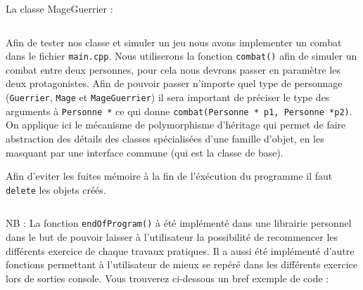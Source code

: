 La classe MageGuerrier :
\inputminted[linenos,firstline=7,lastline=21]{cpp}{../sources/cpp/TP9-10/MageGuerrier.cpp}

Afin de tester nos classe et simuler un jeu nous avons implementer un combat dans le fichier \texttt{main.cpp}.
Nous utiliserons la fonction \texttt{combat()} afin de simuler un combat entre deux personnes, pour cela nous devrons passer en paramètre les deux protagonistes.
Afin de pouvoir passer n'importe quel type de personnage (\texttt{Guerrier}, \texttt{Mage} et \texttt{MageGuerrier}) il sera important de préciser le type des arguments à \texttt{Personne *} ce qui donne \texttt{combat(Personne * p1, Personne *p2)}.
On applique ici le mécanisme de polymorphisme d'héritage qui permet de faire abstraction des détails des classes spécialisées d'une famille d'objet, en les masquant par une interface commune (qui est la classe de base).

Afin d'eviter les fuites mémoire à la fin de l'éxécution du programme il faut \texttt{delete} les objets créés.

\inputminted[linenos,firstline=43,lastline=60]{cpp}{../sources/cpp/TP9-10/main.cpp}

NB : La fonction \texttt{endOfProgram()} à été implémenté dans une librairie personnel dans le but de pouvoir laisser à l'utilisateur la possibilité de recommencer les différents exercice de chaque travaux pratiques. Il a aussi été implémenté d'autre fonctions permettant à l'utilisateur de mieux se repéré dans les différents exercice lors de sorties console. Vous trouverez ci-dessous un bref exemple de code :

\inputminted[linenos,firstline=8,lastline=26]{cpp}{../sources/cpp/libs/libs.c}
